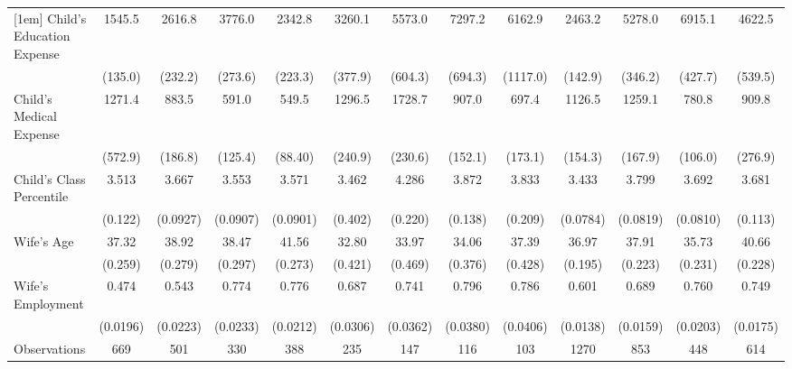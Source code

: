 \documentclass[12pt]{extarticle}
\begin{document}
\begin{landscape}
\begin{table}
\begin{threeparttable}
\begin{tabular}{l*{12}{c}}
[1em]
Child's Education Expense&      1545.5&      2616.8&      3776.0&      2342.8&      3260.1&      5573.0&      7297.2&      6162.9&      2463.2&      5278.0&      6915.1&      4622.5\\
                    &     (135.0)&     (232.2)&     (273.6)&     (223.3)&     (377.9)&     (604.3)&     (694.3)&    (1117.0)&     (142.9)&     (346.2)&     (427.7)&     (539.5)\\
[1em]
Child's Medical Expense&      1271.4&       883.5&       591.0&       549.5&      1296.5&      1728.7&       907.0&       697.4&      1126.5&      1259.1&       780.8&       909.8\\
                    &     (572.9)&     (186.8)&     (125.4)&     (88.40)&     (240.9)&     (230.6)&     (152.1)&     (173.1)&     (154.3)&     (167.9)&     (106.0)&     (276.9)\\
[1em]
Child's Class Percentile    &       3.513&       3.667&       3.553&       3.571&       3.462&       4.286&       3.872&       3.833&       3.433&       3.799&       3.692&       3.681\\
                    &     (0.122)&    (0.0927)&    (0.0907)&    (0.0901)&     (0.402)&     (0.220)&     (0.138)&     (0.209)&    (0.0784)&    (0.0819)&    (0.0810)&     (0.113)\\                    
[1em]
Wife's Age          &       37.32&       38.92&       38.47&       41.56&       32.80&       33.97&       34.06&       37.39&       36.97&       37.91&       35.73&       40.66\\
                    &     (0.259)&     (0.279)&     (0.297)&     (0.273)&     (0.421)&     (0.469)&     (0.376)&     (0.428)&     (0.195)&     (0.223)&     (0.231)&     (0.228)\\
[1em]                    
Wife's Employment   &       0.474&       0.543&       0.774&       0.776&       0.687&       0.741&       0.796&       0.786&       0.601&       0.689&       0.760&       0.749\\
                    &    (0.0196)&    (0.0223)&    (0.0233)&    (0.0212)&    (0.0306)&    (0.0362)&    (0.0380)&    (0.0406)&    (0.0138)&    (0.0159)&    (0.0203)&    (0.0175)\\
\hline
Observations        &        669&        501&         330&        388&        235&        147&         116&        103&        1270&        853&         448&        614\\    
\hline\hline
\end{tabular}
\begin{tablenotes}

\end{tablenotes}
\end{threeparttable}
\end{table}
\end{landscape}
\end{document}
